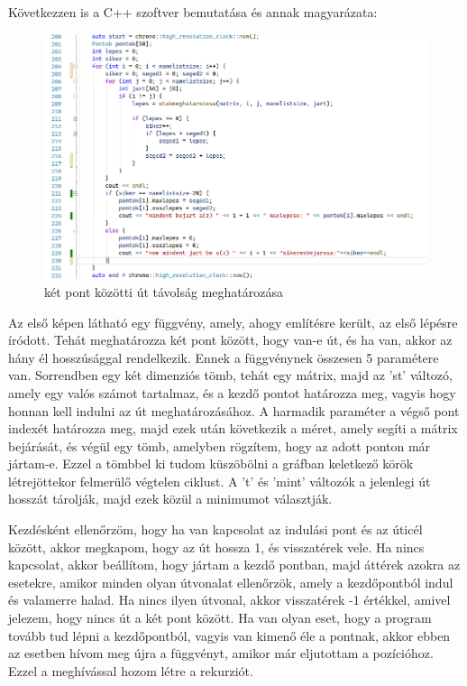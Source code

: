 \newpage
Következzen is a C++ szoftver bemutatása és annak magyarázata:


\begin{figure}[!h]
	\centering
	\includegraphics[scale=0.7]{images/utaskod}
	\caption{két pont közötti út távolság meghatározása}
\end{figure}

Az első képen látható egy függvény, amely, ahogy említésre került, az első lépésre íródott. Tehát meghatározza két pont között, hogy van-e út, és ha van, akkor az hány él hosszúsággal rendelkezik. Ennek a függvénynek összesen 5 paramétere van. Sorrendben egy két dimenziós tömb, tehát egy mátrix, majd az 'st' változó, amely egy valós számot tartalmaz, és a kezdő pontot határozza meg, vagyis hogy honnan kell indulni az út meghatározásához. A harmadik paraméter a végső pont indexét határozza meg, majd ezek után következik a méret, amely segíti a mátrix bejárását, és végül egy tömb, amelyben rögzítem, hogy az adott ponton már jártam-e. Ezzel a tömbbel ki tudom küszöbölni a gráfban keletkező körök létrejöttekor felmerülő végtelen ciklust.
A 't' és 'mint' változók a jelenlegi út hosszát tárolják, majd ezek közül a minimumot választják.

Kezdésként ellenőrzöm, hogy ha van kapcsolat az indulási pont és az úticél között, akkor megkapom, hogy az út hossza 1, és visszatérek vele. Ha nincs kapcsolat, akkor beállítom, hogy jártam a kezdő pontban, majd áttérek azokra az esetekre, amikor minden olyan útvonalat ellenőrzök, amely a kezdőpontból indul és valamerre halad. Ha nincs ilyen útvonal, akkor visszatérek -1 értékkel, amivel jelezem, hogy nincs út a két pont között. Ha van olyan eset, hogy a program tovább tud lépni a kezdőpontból, vagyis van kimenő éle a pontnak, akkor ebben az esetben hívom meg újra a függvényt, amikor már eljutottam a pozícióhoz. Ezzel a meghívással hozom létre a rekurziót.

